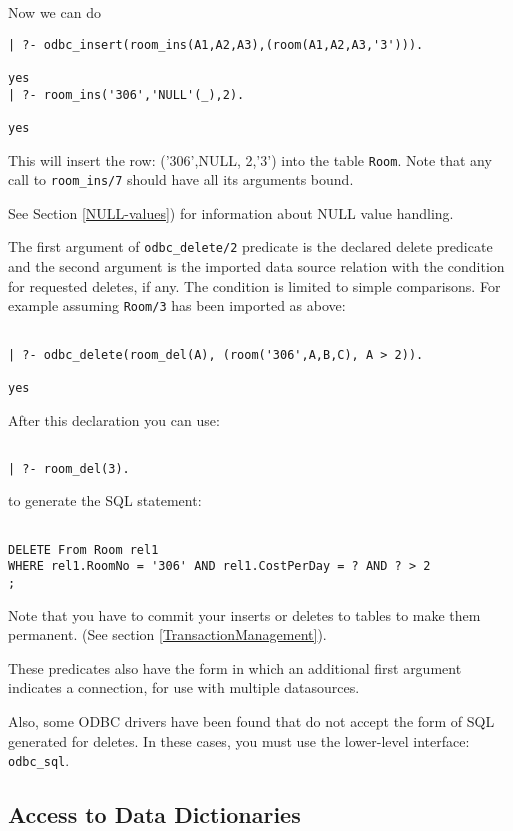 Now we can do

\begin{verbatim}
| ?- odbc_insert(room_ins(A1,A2,A3),(room(A1,A2,A3,'3'))).

yes
| ?- room_ins('306','NULL'(_),2).

yes
\end{verbatim}
This will insert the row: ('306',NULL, 2,'3') into the table {\tt Room}. Note that 
any call to {\tt room\_ins/7} should have all its arguments bound.

See Section \ref{NULL-values}) for information about NULL value
handling.

The first argument of {\tt odbc\_delete/2} predicate is the declared delete
predicate and the second argument is the imported data source relation
with the condition for requested deletes, if any.  The condition is
limited to simple comparisons.  For example assuming
{\tt Room/3} has been imported as above:
\begin{verbatim}

| ?- odbc_delete(room_del(A), (room('306',A,B,C), A > 2)). 

yes
\end{verbatim}

After this declaration you can use:
\begin{verbatim}

| ?- room_del(3).
\end{verbatim}

to generate the SQL statement:
\begin{verbatim}

DELETE From Room rel1 
WHERE rel1.RoomNo = '306' AND rel1.CostPerDay = ? AND ? > 2
;
\end{verbatim}

Note that you have to commit your inserts or deletes to tables to make
them permanent.  (See section \ref{TransactionManagement}).

These predicates also have the form in which an additional first
argument indicates a connection, for use with multiple datasources.

Also, some ODBC drivers have been found that do not accept the form of
SQL generated for deletes.  In these cases, you must use the
lower-level interface: {\tt odbc\_sql}.

\subsection{Access to Data Dictionaries}


